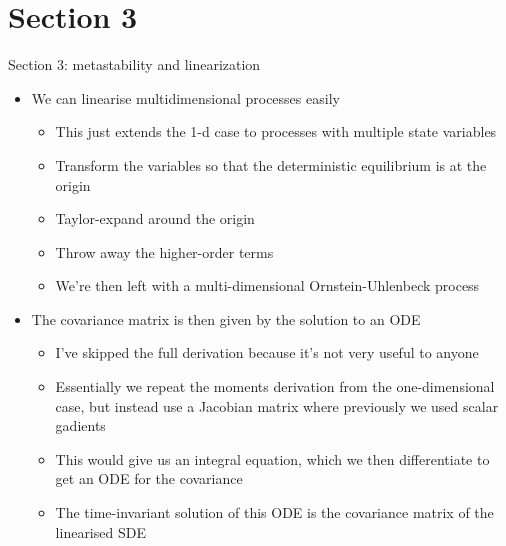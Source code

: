 \documentclass[presentation]{beamer}
\begin{document}
\section{Section 3}
\label{sec:org439926d}
\begin{frame}[label={sec:org4e7cb73},plain]{Section 3: metastability and linearization}
\begin{itemize}
\item We can linearise multidimensional processes easily
\begin{itemize}
\item This just extends the 1-d case to processes with multiple state variables
\item Transform the variables so that the deterministic equilibrium is at the origin
\item Taylor-expand around the origin
\item Throw away the higher-order terms
\item We're then left with a multi-dimensional Ornstein-Uhlenbeck process
\end{itemize}
\end{itemize}

\vfill
\begin{itemize}
\item The covariance matrix is then given by the solution to an ODE
\begin{itemize}
\item I've skipped the full derivation because it's not very useful to anyone
\item Essentially we repeat the moments derivation from the one-dimensional case, but instead use a Jacobian matrix where previously we used scalar gadients
\item This would give us an integral equation, which we then differentiate to get an ODE for the covariance
\item The time-invariant solution of this ODE is the covariance matrix of the linearised SDE
\end{itemize}
\end{itemize}


\end{frame}
\end{document}
